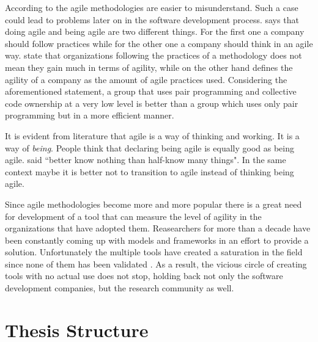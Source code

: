 According to \citet{6427226} the agile methodologies are easier to misunderstand. Such a case could lead to problems later on in the software development process. \citet{sahota} says that doing agile and being agile are two different things. For the first one a company should follow practices while for the other one a company should think in an agile way. \citet{lappoA04} state that organizations following the practices of a methodology does not mean they gain much in terms of agility, while on the other hand \citet{sidky_dissertation} defines the agility of a company as the amount of agile practices used. Considering the aforementioned statement, a group that uses pair programming and collective code ownership at a very low level is better than a group which uses only pair programming but in a more efficient manner.

It is evident from literature that agile is a way of thinking and working. It is a way of \textit{being}. People think that declaring being agile is equally good as being agile. \citet{Nietzsche} said ``better know nothing than half-know many things". In the same context maybe it is better not to transition to agile instead of thinking being agile. 

Since agile methodologies become more and more popular there is a great need for development of a tool that can measure the level of agility in the organizations that have adopted them. Reasearchers for more than a decade have been constantly coming up with models and frameworks in an effort to provide a solution. Unfortunately the multiple tools have created a saturation in the field since none of them has been validated \cite{samireh_jalali_dissertation}. As a result, the vicious circle of creating tools with no actual use does not stop, holding back not only the software development companies, but the research community as well.


\section{Thesis Structure}



%

